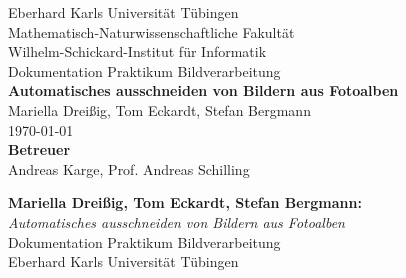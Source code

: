 \documentclass[12pt,a4paper]{scrreprt}
\begin{document}
\begin{titlepage}
\begin{center}
\LARGE Eberhard Karls Universität Tübingen\\
\large Mathematisch-Naturwissenschaftliche Fakultät \\
Wilhelm-Schickard-Institut für Informatik\\
[3cm]
\huge Dokumentation Praktikum Bildverarbeitung\\
[2cm]
\Large\textbf{Automatisches ausschneiden von Bildern aus Fotoalben}\\
[1.5cm]
\large Mariella Dreißig, Tom Eckardt, Stefan Bergmann\\
[0.5cm]
\today\\
\vfill
\small\textbf{Betreuer}\\[0.3cm]
\large Andreas Karge, Prof. Andreas Schilling\\
\end{center}
\end{titlepage}

\thispagestyle{empty}
\vspace*{\fill}
\textbf{Mariella Dreißig, Tom Eckardt, Stefan Bergmann:}\\
\emph{Automatisches ausschneiden von Bildern aus Fotoalben}\\
Dokumentation Praktikum Bildverarbeitung \\
Eberhard Karls Universität Tübingen\\
\newpage




\newpage

\tableofcontents\label{toc}
\cleardoublepage


\cleardoublepage


\cleardoublepage


\cleardoublepage


\newpage


\cleardoublepage


\cleardoublepage


\cleardoublepage


\cleardoublepage
\end{document}
